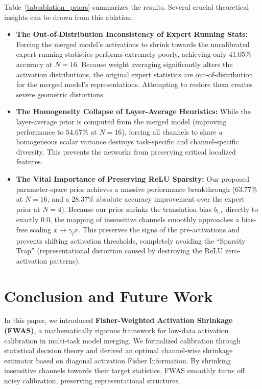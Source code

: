 \documentclass{article}
\theoremstyle{plain}
\theoremstyle{definition}
\theoremstyle{remark}
\begin{document}
Table~\ref{tab:ablation_priors} summarizes the results. Several crucial theoretical insights can be drawn from this ablation:
\begin{itemize}
    \item \textbf{The Out-of-Distribution Inconsistency of Expert Running Stats:} Forcing the merged model's activations to shrink towards the uncalibrated expert running statistics performs extremely poorly, achieving only $41.05\%$ accuracy at $N=16$. Because weight averaging significantly alters the activation distributions, the original expert statistics are out-of-distribution for the merged model's representations. Attempting to restore them creates severe geometric distortions.
    \item \textbf{The Homogeneity Collapse of Layer-Average Heuristics:} While the layer-average prior is computed from the merged model (improving performance to $54.67\%$ at $N=16$), forcing all channels to share a homogeneous scalar variance destroys task-specific and channel-specific diversity. This prevents the networks from preserving critical localized features.
    \item \textbf{The Vital Importance of Preserving ReLU Sparsity:} Our proposed parameter-space prior achieves a massive performance breakthrough ($63.77\%$ at $N=16$, and a $28.37\%$ absolute accuracy improvement over the expert prior at $N=4$). Because our prior shrinks the translation bias $b_{l,c}$ directly to exactly $0.0$, the mapping of insensitive channels smoothly approaches a bias-free scaling $x \mapsto \gamma_l x$. This preserves the signs of the pre-activations and prevents shifting activation thresholds, completely avoiding the ``Sparsity Trap'' (representational distortion caused by destroying the ReLU zero-activation patterns).
\end{itemize}

\section{Conclusion and Future Work}
\label{sec:conclusion}

In this paper, we introduced \textbf{Fisher-Weighted Activation Shrinkage (FWAS)}, a mathematically rigorous framework for low-data activation calibration in multi-task model merging. We formalized calibration through statistical decision theory and derived an optimal channel-wise shrinkage estimator based on diagonal activation Fisher Information. By shrinking insensitive channels towards their target statistics, FWAS smoothly turns off noisy calibration, preserving representational structures. 
\end{document}
